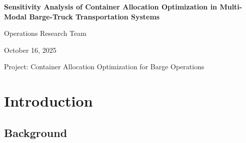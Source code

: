 \documentclass[12pt,a4paper]{article}
\begin{document}
\begin{titlepage}
\centering
\vspace*{2cm}

{\LARGE\bfseries Sensitivity Analysis of Container Allocation Optimization in Multi-Modal Barge-Truck Transportation Systems\par}

\vspace{2cm}

{\large Operations Research Team\par}
\vspace{0.5cm}
{\large October 16, 2025\par}

\vspace{2cm}

{\large Project: Container Allocation Optimization for Barge Operations\par}

\vfill

\begin{abstract}
This study presents a comprehensive sensitivity analysis of a meta-heuristic optimization algorithm for container allocation in a multi-modal transportation system combining barge and truck operations. A total of 45 experimental scenarios were conducted to evaluate the impact of key operational parameters on system performance. The analysis employed a hybrid greedy-metaheuristic approach with 3,500 iterations per scenario to ensure convergence. Results demonstrate significant parameter sensitivity with cost variations ranging from €17,808 to €46,342 (160.2\% range), revealing critical insights for operational decision-making. The study identifies truck cost parameters as the dominant cost drivers, while challenging conventional assumptions about economies of scale and fleet expansion benefits.

\textbf{Keywords:} container optimization, sensitivity analysis, meta-heuristic algorithms, multi-modal transportation, barge operations
\end{abstract}

\end{titlepage}

\tableofcontents
\newpage

\section{Introduction}

\subsection{Background}
\end{document}
